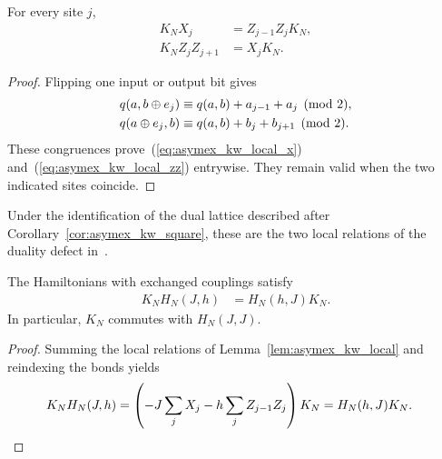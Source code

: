 \begin{lemma}
    \label{lem:asymex_kw_local}
    \leanok
    For every site $j$,
    \begin{align}
        K_NX_j        & =Z_{j-1}Z_jK_N,
        \label{eq:asymex_kw_local_x}    \\
        K_NZ_jZ_{j+1} & =X_jK_N.
        \label{eq:asymex_kw_local_zz}
    \end{align}
\end{lemma}

\begin{proof}
    \leanok
    Flipping one input or output bit gives
    \begin{align}
        q(a,b\oplus e_j) & \equiv q(a,b)+a_{j-1}+a_j\pmod2,
        \notag                                              \\
        q(a\oplus e_j,b) & \equiv q(a,b)+b_j+b_{j+1}\pmod2.
        \notag
    \end{align}
    These congruences prove~(\ref{eq:asymex_kw_local_x})
    and~(\ref{eq:asymex_kw_local_zz}) entrywise.
    They remain valid when the two indicated sites coincide.
\end{proof}

Under the identification of the dual lattice described after
Corollary~\ref{cor:asymex_kw_square}, these are the two local relations
of the duality defect in~\cite{Aasen2016Topological}.

\begin{corollary}
    \label{cor:asymex_kw_exchange}
    \leanok
    The Hamiltonians with exchanged couplings satisfy
    \begin{align}
        K_NH_N(J,h) & =H_N(h,J)K_N.
        \label{eq:asymex_kw_exchange}
    \end{align}
    In particular, $K_N$ commutes with $H_N(J,J)$.
\end{corollary}

\begin{proof}
    \leanok
    Summing the local relations of
    Lemma~\ref{lem:asymex_kw_local} and reindexing the bonds yields
    \begin{align}
        K_NH_N(J,h)
         & =\left(-J\sum_jX_j-h\sum_jZ_{j-1}Z_j\right)K_N
        =H_N(h,J)K_N.
        \notag
    \end{align}
\end{proof}

